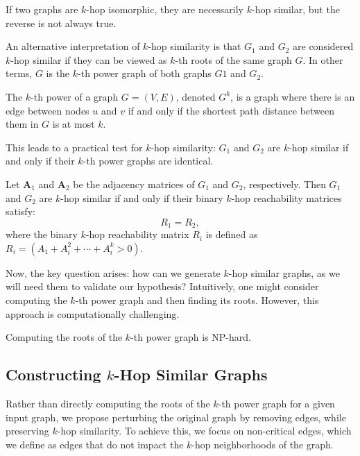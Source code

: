 \begin{proposition} If two graphs are $k$-hop isomorphic, they are necessarily $k$-hop similar, but the reverse is not always true. \end{proposition}

An alternative interpretation of $k$-hop similarity is that $G_1$ and $G_2$ are considered $k$-hop similar if they can be viewed as $k$-th roots of the same graph $G$. In other terms, $G$ is the $k$-th power graph of both graphs $G1$ and $G_2$.

\begin{definition} 
The $k$-th power of a graph $G = (V, E)$, denoted $G^k$, is a graph where there is an edge between nodes $u$ and $v$ if and only if the shortest path distance between them in $G$ is at most $k$. 
\end{definition}

This leads to a practical test for $k$-hop similarity: $G_1$ and $G_2$ are $k$-hop similar if and only if their $k$-th power graphs are identical.

\begin{proposition}Let $\mathbf{A}_1$ and $\mathbf{A}_2$ be the adjacency matrices of $G_1$ and $G_2$, respectively. Then $G_1$ and $G_2$ are $k$-hop similar if and only if their binary $k$-hop reachability matrices satisfy:
$$R_1 = R_2,$$
where the binary $k$-hop reachability matrix $R_i$ is defined as $R_i = (A_1 + A_i^2 + \cdots + A_i^k > 0)$.
\end{proposition}

Now, the key question arises: how can we generate $k$-hop similar graphs, as we will need them to validate our hypothesis? Intuitively, one might consider computing the $k$-th power graph and then finding its roots. However, this approach is computationally challenging.

\begin{theorem} Computing the roots of the $k$-th power graph is NP-hard.\end{theorem}

\subsection{Constructing $k$-Hop Similar Graphs}
Rather than directly computing the roots of the $k$-th power graph for a given input graph, we propose perturbing the original graph by removing edges, while preserving $k$-hop similarity. To achieve this, we focus on non-critical edges, which we define as edges that do not impact the $k$-hop neighborhoods of the graph.

